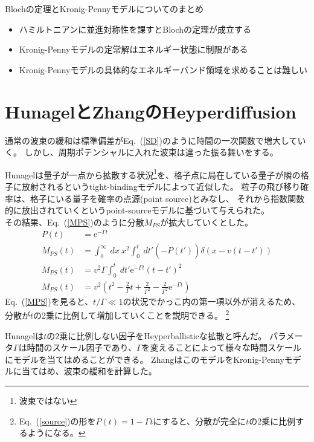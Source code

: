 \documentclass[autodetect-engine,dvipdfmx-if-dvi,ja=standard,a4paper,layout=v2]{bxjsreport}
\newcommand{\eref}[1]{Eq.~(\ref{#1})}
\begin{document}
    \begin{itembox}[l]{Blochの定理とKronig-Pennyモデルについてのまとめ}
        \begin{itemize}
            \item ハミルトニアンに並進対称性を課すとBlochの定理が成立する
            \item Kronig-Pennyモデルの定常解はエネルギー状態に制限がある
            \item Kronig-Pennyモデルの具体的なエネルギーバンド領域を求めることは難しい
        \end{itemize}
    \end{itembox}
    \section{HunagelとZhangのHeyperdiffusion}
    通常の波束の緩和は標準偏差が\eref{SD}のように時間の一次関数で増大していく。
    しかし、周期ポテンシャルに入れた波束は違った振る舞いをする。\par
    Hunagelは量子が一点から拡散する状況\footnote{波束ではない}を、格子点に局在している量子が隣の格子に放射されるというtight-bindingモデルによって近似した。
    粒子の飛び移り確率は、格子にいる量子を確率の点源(point source)とみなし、
    それから指数関数的に放出されていくというpoint-sourceモデルに基づいて与えられた。\\
    その結果、\eref{MPS}のように分散$M_{PS}$が拡大していくとした。
    \begin{align}
    P(t) &= \mathrm{e}^{-\Gamma t}\label{source}\\
    M_{PS}(t)&=\int_{0}^{\infty}\:dx\:x^2\int_{0}^{t}\:dt'(-\dot{P}(t'))\delta(x-v(t-t'))\label{variant}\\
    M_{PS}(t)&=v^2\Gamma\int_{0}^{t}\:dt'\mathrm{e}^{-\Gamma t}(t-t')^2\nonumber\\
    M_{PS}(t)&=v^2\left(t^2-\frac{2}{\Gamma}t+\frac{2}{\Gamma^2}-\frac{2}{\Gamma^2}\mathrm{e}^{-\Gamma t} \right)\label{MPS}
    \end{align}
    \eref{MPS}を見ると、$t/\Gamma \ll 1$の状況でかっこ内の第一項以外が消えるため、
    分散が$t$の2乗に比例して増加していくことを説明できる。
    \footnote{\eref{source}の形を$P(t)=1-\Gamma t$にすると、分散が完全に$t$の2乗に比例するようになる。}\par
    Hunagelは$t$の2乗に比例しない因子をHeyperballisticな拡散と呼んだ。
    パラメータ$\Gamma$は時間のスケール因子であり、$\Gamma$を変えることによって様々な時間スケールにモデルを当てはめることができる。
    ZhangはこのモデルをKronig-Pennyモデルに当てはめ、波束の緩和を計算した。
\end{document}
